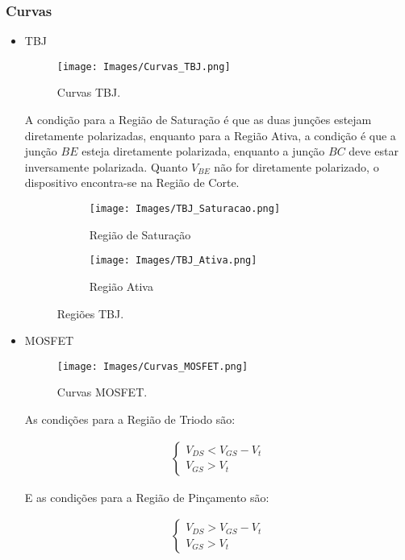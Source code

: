\documentclass[12pt]{article}
\begin{document}
\subsubsection{Curvas}

\begin{itemize}
  \item TBJ
  
  \begin{figure}[H]
    \begin{center}
      \texttt{[image: Images/Curvas\_TBJ.png]}
    \end{center}
    \caption{Curvas TBJ.}
  \end{figure}

  A condição para a Região de Saturação é que as duas junções estejam diretamente polarizadas, enquanto para a Região Ativa, a condição é que a junção $BE$ esteja diretamente polarizada, enquanto a junção $BC$ deve estar inversamente polarizada. Quanto $V_{BE}$ não for diretamente polarizado, o dispositivo encontra-se na Região de Corte.

  \begin{figure}[H]
    \centering
    \begin{subfigure}{.5\linewidth}
      \centering
      \texttt{[image: Images/TBJ\_Saturacao.png]}
      \caption{Região de Saturação}
    \end{subfigure}%
    \begin{subfigure}{.5\linewidth}
      \centering
      \texttt{[image: Images/TBJ\_Ativa.png]}
      \caption{Região Ativa}
    \end{subfigure}
    \caption{Regiões TBJ.}
    \end{figure}


  \item MOSFET
  
  \begin{figure}[H]
    \begin{center}
      \texttt{[image: Images/Curvas\_MOSFET.png]}
    \end{center}
    \caption{Curvas MOSFET.}
  \end{figure}

  As condições para a Região de Triodo são:

  \begin{align*}
    \begin{cases}
      V_{DS} < V_{GS} - V_t \\
      V_{GS} > V_t
    \end{cases}
  \end{align*}
  
  E as condições para a Região de Pinçamento são:

  \begin{align*}
    \begin{cases}
      V_{DS} > V_{GS} - V_t \\
      V_{GS} > V_t
    \end{cases}
  \end{align*}

\end{itemize}
\end{document}
